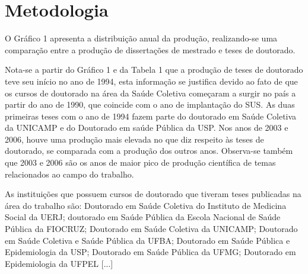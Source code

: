 \chapter{Metodologia}
\label{chap:metodologia}

O Gráfico 1 apresenta a distribuição anual da produção, realizando-se uma comparação entre a produção de dissertações de mestrado e teses de doutorado.

    \begin{figure}[h!]
    	\centering
    	\label{fig_mapa-3}
    \end{figure}

Nota-se a partir do Gráfico 1 e da Tabela 1 que a produção de teses de doutorado teve seu início no ano de 1994, esta informação se justifica devido ao fato de que os cursos de doutorado na área da Saúde Coletiva começaram a surgir no país a partir do ano de 1990, que coincide com o ano de implantação do SUS. As duas primeiras teses com o ano de 1994 fazem parte do doutorado em Saúde Coletiva da UNICAMP e do Doutorado em saúde Pública da USP. Nos anos de 2003 e 2006, houve uma produção mais elevada no que diz respeito às teses de doutorado, se comparada com a produção dos outros anos. Observa-se também que 2003 e 2006 são os anos de maior pico de produção científica de temas relacionados ao campo do trabalho.

As instituições que possuem cursos de doutorado que tiveram teses publicadas na área do trabalho são: Doutorado em Saúde Coletiva do Instituto de Medicina Social da UERJ; doutorado em Saúde Pública da Escola Nacional de Saúde Pública da FIOCRUZ; Doutorado em Saúde Coletiva da UNICAMP; Doutorado em Saúde Coletiva e Saúde Pública da UFBA; Doutorado em Saúde Pública e Epidemiologia da USP; Doutorado em Saúde Pública da UFMG; Doutorado em Epidemiologia da UFPEL [...]

